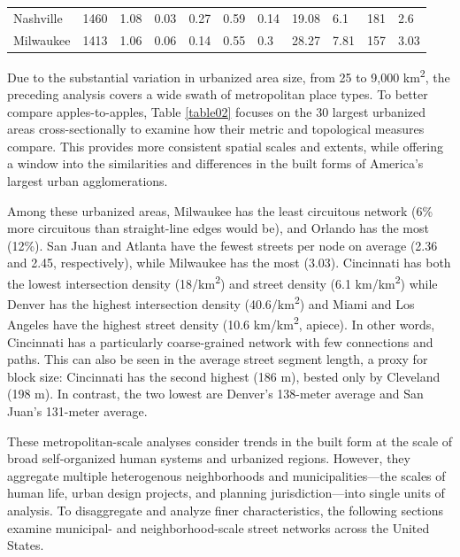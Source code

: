 \documentclass{article}
\begin{document}
\begin{landscape}
\begin{table}
\begin{tabular}{p{2.5cm} p{1.5cm} p{1.5cm} p{1.5cm} p{1.55cm} p{1.5cm} p{1.5cm} p{1.5cm} p{1.5cm} p{1.5cm} p{1.5cm}}
Nashville            & 1460          & 1.08         & 0.03                       & 0.27           & 0.59        & 0.14        & 19.08                 & 6.1                   & 181                   & 2.6              \\
Milwaukee            & 1413          & 1.06         & 0.06                       & 0.14           & 0.55        & 0.3         & 28.27                 & 7.81                  & 157                   & 3.03 \\
\bottomrule
\end{tabular}
\end{table}
\end{landscape}
\restoregeometry

Due to the substantial variation in urbanized area size, from 25 to 9,000 km\textsuperscript{2}, the preceding analysis covers a wide swath of metropolitan place types. To better compare apples-to-apples, Table \ref{table02} focuses on the 30 largest urbanized areas cross-sectionally to examine how their metric and topological measures compare. This provides more consistent spatial scales and extents, while offering a window into the similarities and differences in the built forms of America's largest urban agglomerations. 

Among these urbanized areas, Milwaukee has the least circuitous network (6\% more circuitous than straight-line edges would be), and Orlando has the most (12\%). San Juan and Atlanta have the fewest streets per node on average (2.36 and 2.45, respectively), while Milwaukee has the most (3.03). Cincinnati has both the lowest intersection density (18/km\textsuperscript{2}) and street density (6.1 km/km\textsuperscript{2}) while Denver has the highest intersection density (40.6/km\textsuperscript{2}) and Miami and Los Angeles have the highest street density (10.6 km/km\textsuperscript{2}, apiece). In other words, Cincinnati has a particularly coarse-grained network with few connections and paths. This can also be seen in the average street segment length, a proxy for block size: Cincinnati has the second highest (186 m), bested only by Cleveland (198 m). In contrast, the two lowest are Denver's 138-meter average and San Juan's 131-meter average.

These metropolitan-scale analyses consider trends in the built form at the scale of broad self-organized human systems and urbanized regions. However, they aggregate multiple heterogenous neighborhoods and municipalities---the scales of human life, urban design projects, and planning jurisdiction---into single units of analysis. To disaggregate and analyze finer characteristics, the following sections examine municipal- and neighborhood-scale street networks across the United States.
\end{document}
